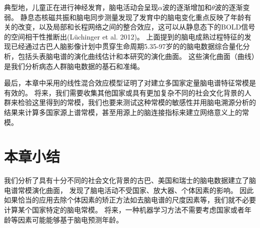 典型地，儿童正在进行神经发育，脑电活动会呈现$\alpha$波的逐渐增加和$\theta$波的逐渐变弱。 静息态核磁共振和脑电同步测量发现了发育中的脑电变化重点反映了年龄有关的改变，以及局部和长程网络之间的整合效应，这可以从静息态下的BOLD信号的空间相干性推断出\citing(Lüchinger et al. 2012)。 上面提到的脑电成熟过程特征的发现已经通过古巴人脑影像计划中贯穿生命周期5.35-97岁的的脑电数据综合量化分析，包括头表脑电谱的演化曲线估计和本研究的演化曲面。 这些演化曲面（曲线）是我们分析病态人群脑电数据的基石和准绳。

最后，本章中采用的线性混合效应模型证明了对建立多国家定量脑电谱特征常模是有效的。 将来，我们需要收集其他国家或具有更加复杂不同的社会文化背景的人群来检验这里得到的常模，我们也要来测试这种常模的敏感性并用脑电溯源分析的结果来计算多国家源上谱常模，甚至用源上的脑连接指标来建立网络意义上的常模。

\section{本章小结}
我们分析了具有十分不同的社会文化背景的古巴、美国和瑞士的脑电数据建立了脑电谱常模演化曲面， 发现了脑电活动不受国家、放大器、个体因素的影响。 因此如果恰当的应用去除个体因素的矫正方法如去脑电谱的尺度因素等，我们就不必要计算某个国家特定的脑电常模。 将来，一种机器学习方法不需要考虑国家或者年龄等因素可能能够基于脑电预测年龄。